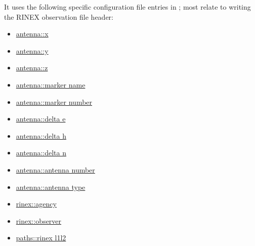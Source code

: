 It uses the following specific configuration file entries in ; most
relate to writing the RINEX observation file header:
\begin{itemize}
	\item \hyperlink{h:antenna_x}{antenna::x}
	\item \hyperlink{h:antenna_y}{antenna::y}
	\item \hyperlink{h:antenna_z}{antenna::z}
	\item \hyperlink{h:antenna_marker_name}{antenna::marker name}
	\item \hyperlink{h:antenna_marker_number}{antenna::marker number}
	\item \hyperlink{h:antenna_delta_e}{antenna::delta e}
	\item \hyperlink{h:antenna_delta_h}{antenna::delta h}
	\item \hyperlink{h:antenna_delta_n}{antenna::delta n}
	\item \hyperlink{h:antenna_antenna_number}{antenna::antenna number}
	\item \hyperlink{h:antenna_antenna_type}{antenna::antenna type}
	\item \hyperlink{h:rinex_agency}{rinex::agency}
	\item \hyperlink{h:rinex_observer}{rinex::observer}
	\item \hyperlink{h:paths_rinex_l1l2}{paths::rinex l1l2}
\end{itemize}
